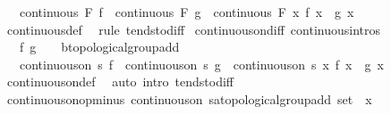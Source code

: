 \begin{isabellebody}
\ \ \ {\isachardoublequoteopen}continuous\ F\ f\ {\isasymLongrightarrow}\ continuous\ F\ g\ {\isasymLongrightarrow}\ continuous\ F\ {\isacharparenleft}{\kern0pt}{\isasymlambda}x{\isachardot}{\kern0pt}\ f\ x\ {\isacharminus}{\kern0pt}\ g\ x{\isacharparenright}{\kern0pt}{\isachardoublequoteclose}\isanewline
%
\isadelimproof
\ \ %
\endisadelimproof
%
\isatagproof
{}\isamarkupfalse%
\ continuous{\isacharunderscore}{\kern0pt}def\ \isamarkupfalse%
\ {\isacharparenleft}{\kern0pt}rule\ tendsto{\isacharunderscore}{\kern0pt}diff{\isacharparenright}{\kern0pt}%
\endisatagproof
{\isafoldproof}%
%
\isadelimproof
\isanewline
%
\endisadelimproof
\isanewline
{}\isamarkupfalse%
\ continuous{\isacharunderscore}{\kern0pt}on{\isacharunderscore}{\kern0pt}diff\ {\isacharbrackleft}{\kern0pt}continuous{\isacharunderscore}{\kern0pt}intros{\isacharbrackright}{\kern0pt}{\isacharcolon}{\kern0pt}\isanewline
\ \ \ f\ g\ {\isacharcolon}{\kern0pt}{\isacharcolon}{\kern0pt}\ {\isachardoublequoteopen}{\isacharunderscore}{\kern0pt}\ {\isasymRightarrow}\ {\isacharprime}{\kern0pt}b{\isacharcolon}{\kern0pt}{\isacharcolon}{\kern0pt}topological{\isacharunderscore}{\kern0pt}group{\isacharunderscore}{\kern0pt}add{\isachardoublequoteclose}\isanewline
\ \ \ {\isachardoublequoteopen}continuous{\isacharunderscore}{\kern0pt}on\ s\ f\ {\isasymLongrightarrow}\ continuous{\isacharunderscore}{\kern0pt}on\ s\ g\ {\isasymLongrightarrow}\ continuous{\isacharunderscore}{\kern0pt}on\ s\ {\isacharparenleft}{\kern0pt}{\isasymlambda}x{\isachardot}{\kern0pt}\ f\ x\ {\isacharminus}{\kern0pt}\ g\ x{\isacharparenright}{\kern0pt}{\isachardoublequoteclose}\isanewline
%
\isadelimproof
\ \ %
\endisadelimproof
%
\isatagproof
{}\isamarkupfalse%
\ continuous{\isacharunderscore}{\kern0pt}on{\isacharunderscore}{\kern0pt}def\ \isamarkupfalse%
\ {\isacharparenleft}{\kern0pt}auto\ intro{\isacharcolon}{\kern0pt}\ tendsto{\isacharunderscore}{\kern0pt}diff{\isacharparenright}{\kern0pt}%
\endisatagproof
{\isafoldproof}%
%
\isadelimproof
\isanewline
%
\endisadelimproof
\isanewline
{}\isamarkupfalse%
\ continuous{\isacharunderscore}{\kern0pt}on{\isacharunderscore}{\kern0pt}op{\isacharunderscore}{\kern0pt}minus{\isacharcolon}{\kern0pt}\ {\isachardoublequoteopen}continuous{\isacharunderscore}{\kern0pt}on\ {\isacharparenleft}{\kern0pt}s{\isacharcolon}{\kern0pt}{\isacharcolon}{\kern0pt}{\isacharprime}{\kern0pt}a{\isacharcolon}{\kern0pt}{\isacharcolon}{\kern0pt}topological{\isacharunderscore}{\kern0pt}group{\isacharunderscore}{\kern0pt}add\ set{\isacharparenright}{\kern0pt}\ {\isacharparenleft}{\kern0pt}{\isacharparenleft}{\kern0pt}{\isacharminus}{\kern0pt}{\isacharparenright}{\kern0pt}\ x{\isacharparenright}{\kern0pt}{\isachardoublequoteclose}\isanewline

\end{isabellebody}
